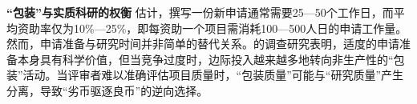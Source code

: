 \textbf{“包装”与实质科研的权衡} \quad \cite{schweigerCostsCompetitionDistributing2024}估计，撰写一份新申请通常需要25—50个工作日，而平均资助率仅为10\%—25\%，即每资助一个项目需消耗100—500人日的申请工作量。然而，申请准备与研究时间并非简单的替代关系。\cite{myersTradeoffsCompetitionGrant2024}的调查研究表明，适度的申请准备本身具有科学价值，但当竞争过度时，边际投入越来越多地转向非生产性的“包装”活动。当评审者难以准确评估项目质量时，“包装质量”可能与“研究质量”产生分离，导致“劣币驱逐良币”的逆向选择。




